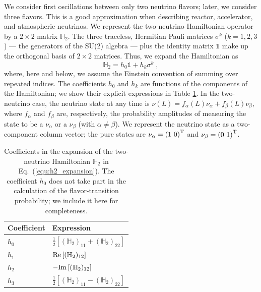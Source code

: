 \documentclass[final,5p,times,twocolumn]{elsarticle}
\newcommand{\eq}{Eq.}
\newcommand{\equ}[1]{\eq~(\ref{equ:#1})}
\begin{document}
We consider first oscillations between only two neutrino flavors; later, we consider three flavors.  This is a good approximation when describing reactor, accelerator, and atmospheric neutrinos.  We represent the two-neutrino Hamiltonian operator by a $2 \times 2$ matrix $\mathbb{H}_2$.  The three traceless, Hermitian Pauli matrices $\sigma^k$ ($k=1,2,3$) --- the generators of the SU(2) algebra --- plus the identity matrix $\mathbb{1}$ make up the orthogonal basis of $2 \times 2$ matrices.  Thus, we expand the Hamiltonian as
\begin{equation}
 \label{equ:h2_expansion}
 \mathbb{H}_2 = h_0 \mathbb{1} + h_k \sigma^k \;,
\end{equation}
where, here and below, we assume the Einstein convention of summing over repeated indices.  The coefficients $h_0$ and $h_k$ are functions of the components of the Hamiltonian; we show their explicit expressions in Table \ref{tab:h2_coefficients}.  In the two-neutrino case, the neutrino state at any time is $\nu(L) = f_\alpha(L) \nu_\alpha + f_\beta(L) \nu_\beta$, where $f_\alpha$ and $f_\beta$ are, respectively, the probability amplitudes of measuring the state to be a $\nu_\alpha$ or a $\nu_\beta$ (with $\alpha \neq \beta$).  We represent the neutrino state as a two-component column vector; the pure states are $\nu_\alpha = \left(1~0\right)^{\rm T}$ and $\nu_\beta = \left(0~1\right)^{\rm T}$.

{\def\arraystretch{1.2}
\begin{table}[t!]
  \begin{tabular}{ll}
   Coefficient & Expression \\
   \hline
   $h_0$ & $\frac{1}{2}\left[(\mathbb{H}_2)_{11}+(\mathbb{H}_2)_{22}\right]$ \\
   $h_1$ & ${\rm Re}\left[ (\mathbb{H}_2)_{12} \right]$ \\
   $h_2$ & $-{\rm Im}\left[ (\mathbb{H}_2)_{12} \right]$ \\
   $h_3$ & $\frac{1}{2}\left[(\mathbb{H}_2)_{11}-(\mathbb{H}_2)_{22}\right]$ \\
  \end{tabular}
  \caption{\label{tab:h2_coefficients}Coefficients in the expansion of the two-neutrino Hamiltonian $\mathbb{H}_2$ in \equ{h2_expansion}.  The coefficient $h_0$ does not take part in the calculation of the flavor-transition probability; we include it here for completeness.}
\end{table}
}
\end{document}
